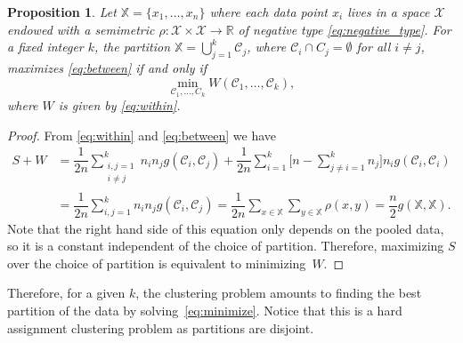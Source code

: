\documentclass[aps,preprint,nofootinbib,floatfix]{revtex4-1}
\newtheorem{proposition}[theorem]{Proposition}
\newcommand\C{{\mathcal{C}}}
\begin{document}
\begin{proposition}
\label{th:minimize}
Let $\mathbb{X} = \{x_1,\dotsc,x_n\}$ where each data point
$x_i$ lives in a space $\mathcal{X}$ endowed with a semimetric $\rho:
\mathcal{X}\times\mathcal{X} \to \mathbb{R}$ of
negative type \eqref{eq:negative_type}. For a fixed integer $k$,
the partition
$\mathbb{X} = \bigcup_{j=1}^k \C_j$, where $\C_i \cap C_j = \emptyset$ for
all $i\ne j$, maximizes \eqref{eq:between} if and only if
\begin{equation}
\label{eq:minimize}
\min_{\C_1,\dotsc,C_k  } W(
\C_1, \dotsc, \C_k),
\end{equation}
where $W$ is given by \eqref{eq:within}.
\end{proposition}
\begin{proof}
From \eqref{eq:within} and \eqref{eq:between}
we have
\begin{equation}
\begin{split}
S + W &= 
\dfrac{1}{2n} \sum_{\substack{i,j=1 \\ i\ne j}}^k n_i n_j g(\C_i, \C_j)
+ \dfrac{1}{2n} \sum_{i=1}^{k} 
\bigg[ n - 
\sum_{j\ne i = 1}^k n_j \bigg] 
n_i g(\C_i, \C_i) 
\\
& = \dfrac{1}{2n} \sum_{i,j=1}^k n_i n_j g(\C_i, \C_j)
= \dfrac{1}{2n} \sum_{x \in \mathbb{X}} \sum_{y \in \mathbb{X}} \rho(x,y)
= \dfrac{n}{2} g(\mathbb{X}, \mathbb{X}).
\end{split}
\end{equation}
Note that the right hand side of this equation 
only depends on the pooled data, so it is a constant
independent of the choice of partition. Therefore, maximizing
$S$ over the choice of partition is equivalent to minimizing~$W$.
\end{proof}

Therefore, for a given $k$, the clustering problem amounts to
finding the best partition of the data by solving~\eqref{eq:minimize}.
Notice that this is a hard assignment clustering problem as partitions
are disjoint.
\end{document}
